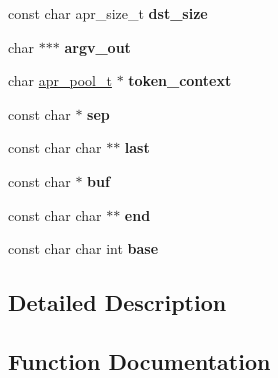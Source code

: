 \begin{DoxyCompactItemize}
const char apr\+\_\+size\+\_\+t {\bfseries dst\+\_\+size}
\item 
\mbox{\label{group__apr__strings_gaf6c5fef3e228783f7e8da6571bfc7a92}} 
char $\ast$$\ast$$\ast$ {\bfseries argv\+\_\+out}
\item 
\mbox{\label{group__apr__strings_gaaa008198151b382d5643a593d4a3a630}} 
char \mbox{\hyperlink{group__apr__pools_gaf137f28edcf9a086cd6bc36c20d7cdfb}{apr\+\_\+pool\+\_\+t}} $\ast$ {\bfseries token\+\_\+context}
\item 
\mbox{\label{group__apr__strings_ga0234c8660bac5d4b5e016b1e715aed77}} 
const char $\ast$ {\bfseries sep}
\item 
\mbox{\label{group__apr__strings_ga882d08c2e3ad3004cdfc219601ebaac8}} 
const char char $\ast$$\ast$ {\bfseries last}
\item 
\mbox{\label{group__apr__strings_ga1fe855c208bc17a51a4d34fefdb2d5b1}} 
const char $\ast$ {\bfseries buf}
\item 
\mbox{\label{group__apr__strings_ga87c7e3f3f70b6e7de10e3f56e3f4d7a4}} 
const char char $\ast$$\ast$ {\bfseries end}
\item 
\mbox{\label{group__apr__strings_ga4f273a965cc36c5abc3b82c390914c29}} 
const char char int {\bfseries base}
\end{DoxyCompactItemize}


\subsection{Detailed Description}


\subsection{Function Documentation}
\mbox{\label{group__apr__strings_gad294ac1597b7ef2e799d42be2aebd407}} 
